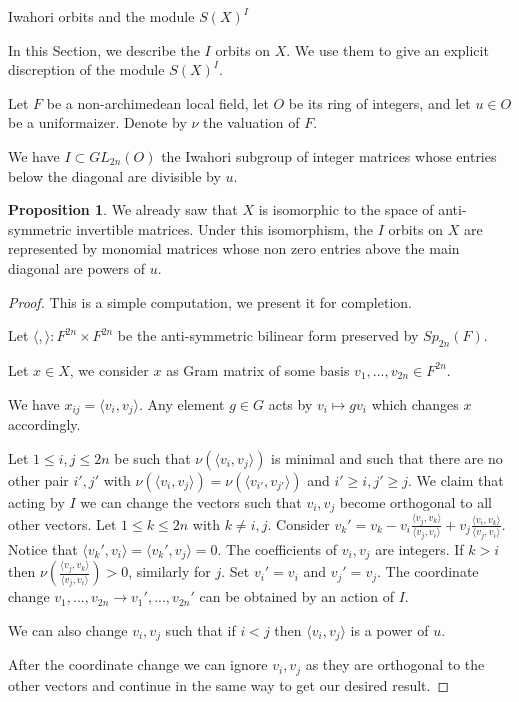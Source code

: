 \documentclass[12pt]{article}
\newcommand{\<}{\langle}
\renewcommand{\>}{\rangle}
\theoremstyle{plain}
\theoremstyle{definition}
\newtheorem{prop}[theorem]{Proposition}
\begin{document}
\begin{section}{Iwahori orbits and the module $S(X)^I$}\label{s5}

In this Section, we describe the $I$ orbits on $X$. We use them to give an explicit discreption of the module $S(X)^I$.

Let $F$ be a non-archimedean local field, let $O$ be its ring of integers, and let $u\in O$ be a uniformaizer. Denote by $\nu$ the valuation of $F$. 


We have $I\subset GL_{2n}(O)$ the Iwahori subgroup of integer matrices whose entries below the diagonal are divisible by $u$.

\begin{prop}\label{I orbits}
    We already saw that $X$ is isomorphic to the space of anti-symmetric invertible matrices. Under this isomorphism, the $I$ orbits on $X$ are represented by monomial matrices whose non zero entries above the main diagonal are powers of $u$.
\end{prop}

\begin{proof}
    This is a simple computation, we present it for completion.

    Let $\<,\>:F^{2n}\times F^{2n}$ be the anti-symmetric bilinear form preserved by $Sp_{2n}(F)$.

    Let $x\in X$, we consider $x$ as Gram matrix of some basis $v_1,...,v_{2n}\in F^{2n}$. 
    
    We have $x_{ij}=\<v_i,v_j\>$. Any element $g\in G$ acts by $v_i\mapsto gv_i$ which changes $x$ accordingly. 

    Let $1\leq i,j\leq 2n$ be such that $\nu(\<v_i,v_j\>)$ is minimal and such that there are no other pair $i',j'$ with $\nu(\<v_i,v_j\>)=\nu(\<v_{i'},v_{j'}\>)$ and $i'\geq i,j'\geq j$. We claim that acting by $I$ we can change the vectors such that $v_i,v_j$ become orthogonal to all other vectors. Let $1\leq k\leq 2n$ with $k\neq i,j$.  Consider $v_k'=v_k-v_i\frac{\<v_j,v_k\>}{\<v_j,v_i\>}+v_j\frac{\<v_i,v_k\>}{\<v_j,v_i\>}$. Notice that $\<v_k',v_i\>=\<v_k',v_j\>=0$. The coefficients of $v_i,v_j$ are integers. If $k>i$ then $\nu(\frac{\<v_j,v_k\>}{\<v_j,v_i\>})>0$, similarly for $j$. Set $v_i'=v_i$ and $v_j'=v_j$. The coordinate change $v_1,...,v_{2n}\rightarrow v_1',...,v_{2n}'$ can be obtained by an action of $I$. 

    We can also change $v_i,v_j$ such that if $i<j$ then $\<v_i,v_j\>$ is a power of $u$.

    After the coordinate change we can ignore $v_i,v_j$ as they are orthogonal to the other vectors and continue in the same way to get our desired result.


\end{proof}
\end{section}
\end{document}
